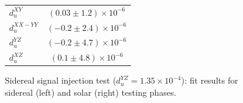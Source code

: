 \begin{figure}[H]
\begin{minipage}[H]{0.49\textwidth}
    \centering
    \begin{tabular}{|l|c|}
        \hline
        $d_u^{XY}$ & $ (0.03 \pm 1.2)\times 10^{-6}$ \\
        $d_u^{XX-YY}$ & $ (-0.2 \pm 2.4)\times 10^{-6}$ \\
        $d_u^{YZ}$ & $ (-0.2 \pm 4.7)\times 10^{-6}$ \\
        $d_u^{XZ}$ & $ (0.1 \pm 4.8)\times 10^{-6}$ \\
        \hline
        \end{tabular}
\end{minipage}
\caption{Sidereal signal injection test ($d_u^{YZ} = 1.35 \times 10^{-4}$): fit results for sidereal (left) and solar (right) testing phases.}
\label{fig:sidereal_signal_1000_scrambles_scan_fit}
\end{figure}


